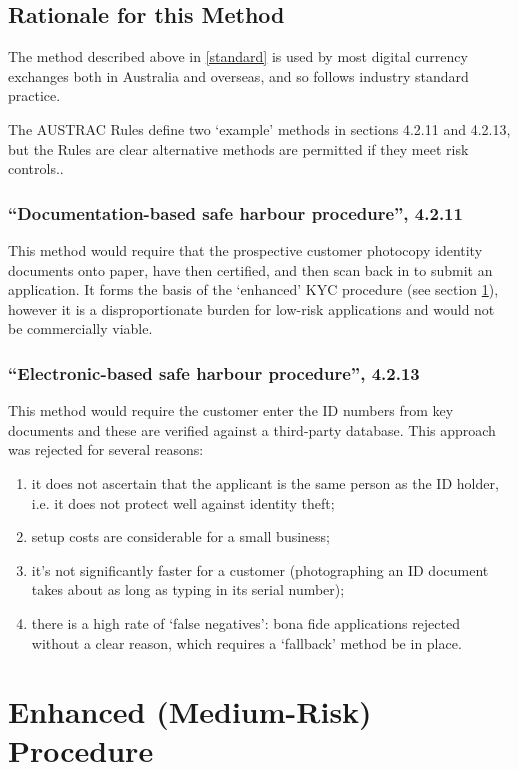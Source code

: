 \documentclass[12pt]{report}
\begin{document}
\subsection{Rationale for this Method}

The method described above in \ref{standard} is used by most digital currency exchanges both in Australia and overseas, and so follows
industry standard practice.

The AUSTRAC Rules define two `example' methods in sections 4.2.11 and 4.2.13, but the Rules are clear alternative methods are permitted
if they meet risk controls..

\subsubsection{``Documentation-based safe harbour procedure'', 4.2.11}

This method would require that the prospective customer photocopy
identity documents onto paper, have then certified, and then scan back in to submit an application.
It forms the basis of the `enhanced' KYC procedure (see section \ref{enhanced}), however it is
a disproportionate burden for low-risk applications and would not be commercially viable.

\subsubsection{``Electronic-based safe harbour procedure'', 4.2.13}

This method would require the customer enter the ID numbers from key documents and these
are verified against a third-party database. This approach was rejected for several reasons:
\begin{enumerate}
\item it does not ascertain that the applicant is the same person as the ID holder, i.e. it does not protect well against identity theft;
\item setup costs are considerable for a small business;
\item it's not significantly faster for a customer (photographing an ID document takes about as long as typing in its serial number);
\item there is a high rate of `false negatives': bona fide applications rejected without a clear reason, which requires a `fallback' method
  be in place. 
\end{enumerate}

\section{Enhanced (Medium-Risk) Procedure} \label{enhanced}
\end{document}
